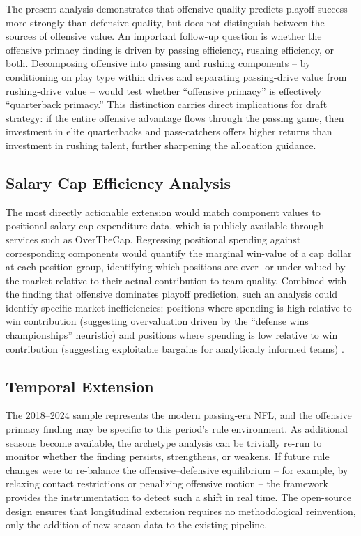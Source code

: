 The present analysis demonstrates that offensive quality predicts playoff success more strongly than defensive quality, but does not distinguish between the sources of offensive value. An important follow-up question is whether the offensive primacy finding is driven by passing efficiency, rushing efficiency, or both. Decomposing offensive \xvoa{} into passing and rushing components  -- by conditioning on play type within drives and separating passing-drive value from rushing-drive value  -- would test whether ``offensive primacy'' is effectively ``quarterback primacy.'' This distinction carries direct implications for draft strategy: if the entire offensive advantage flows through the passing game, then investment in elite quarterbacks and pass-catchers offers higher returns than investment in rushing talent, further sharpening the allocation guidance.

\subsection{Salary Cap Efficiency Analysis}

The most directly actionable extension would match \gds{} component values to positional salary cap expenditure data, which is publicly available through services such as OverTheCap. Regressing positional spending against corresponding \xvoa{} components would quantify the marginal win-value of a cap dollar at each position group, identifying which positions are over- or under-valued by the market relative to their actual contribution to team quality. Combined with the finding that offensive \xvoa{} dominates playoff prediction, such an analysis could identify specific market inefficiencies: positions where spending is high relative to win contribution (suggesting overvaluation driven by the ``defense wins championships'' heuristic) and positions where spending is low relative to win contribution (suggesting exploitable bargains for analytically informed teams) \parencite{borghesi2008allocation, mulholland2019optimizing}.

\subsection{Temporal Extension}

The 2018--2024 sample represents the modern passing-era NFL, and the offensive primacy finding may be specific to this period's rule environment. As additional seasons become available, the archetype analysis can be trivially re-run to monitor whether the finding persists, strengthens, or weakens. If future rule changes were to re-balance the offensive--defensive equilibrium  -- for example, by relaxing contact restrictions or penalizing offensive motion  -- the framework provides the instrumentation to detect such a shift in real time. The open-source design ensures that longitudinal extension requires no methodological reinvention, only the addition of new season data to the existing pipeline.


